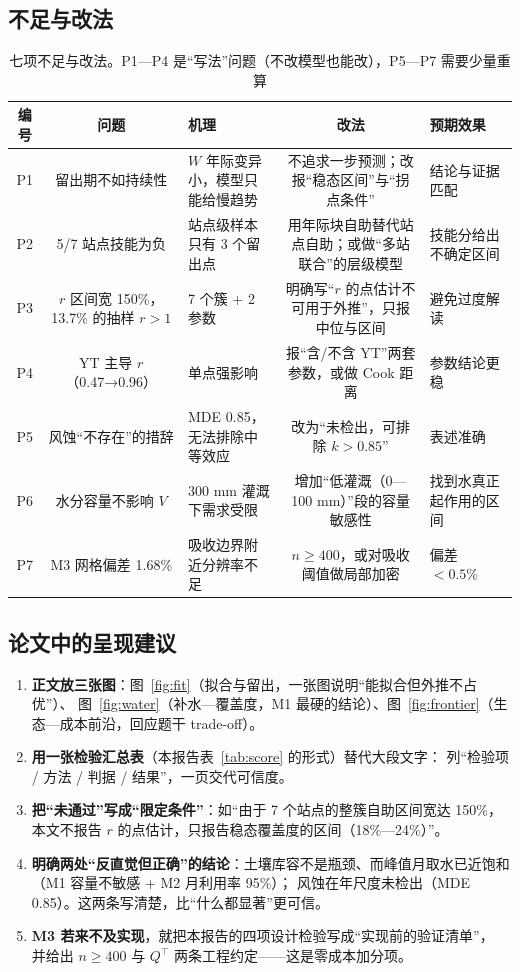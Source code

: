 \documentclass[11pt,a4paper]{ctexart}
\begin{document}
\subsection{不足与改法}

\begin{table}[htbp]\centering\footnotesize
\begin{tabularx}{\textwidth}{|c|c|X|c|X|}
\toprule
编号 & 问题 & 机理 & 改法 & 预期效果 \\
\midrule
P1 & 留出期不如持续性 & $W$ 年际变异小，模型只能给慢趋势 & 不追求一步预测；改报“稳态区间”与“拐点条件”
& 结论与证据匹配 \\
P2 & 5/7 站点技能为负 & 站点级样本只有 3 个留出点 & 用年际块自助替代站点自助；或做“多站联合”的层级模型
& 技能分给出不确定区间 \\
P3 & $r$ 区间宽 150\%，13.7\% 的抽样 $r>1$ & 7 个簇 + 2 参数 & 明确写“$r$ 的点估计不可用于外推”，只报中位与区间
& 避免过度解读 \\
P4 & YT 主导 $r$（0.47→0.96） & 单点强影响 & 报“含/不含 YT”两套参数，或做 Cook 距离
& 参数结论更稳 \\
P5 & 风蚀“不存在”的措辞 & MDE 0.85，无法排除中等效应 & 改为“未检出，可排除 $k>0.85$”
& 表述准确 \\
P6 & 水分容量不影响 $V$ & 300 mm 灌溉下需求受限 & 增加“低灌溉（0—100 mm）”段的容量敏感性
& 找到水真正起作用的区间 \\
P7 & M3 网格偏差 1.68\% & 吸收边界附近分辨率不足 & $n\ge400$，或对吸收阈值做局部加密
& 偏差 $<0.5\%$ \\
\bottomrule
\end{tabularx}
\caption{七项不足与改法。P1—P4 是“写法”问题（不改模型也能改），P5—P7 需要少量重算}\label{tab:fix}
\end{table}

\subsection{论文中的呈现建议}

\begin{enumerate}
\item \textbf{正文放三张图}：图~\ref{fig:fit}（拟合与留出，一张图说明“能拟合但外推不占优”）、
      图~\ref{fig:water}（补水—覆盖度，M1 最硬的结论）、图~\ref{fig:frontier}（生态—成本前沿，回应题干 trade-off）。
\item \textbf{用一张检验汇总表}（本报告表~\ref{tab:score} 的形式）替代大段文字：
      列“检验项 / 方法 / 判据 / 结果”，一页交代可信度。
\item \textbf{把“未通过”写成“限定条件”}：如“由于 7 个站点的整簇自助区间宽达 150\%，
      本文不报告 $r$ 的点估计，只报告稳态覆盖度的区间（18\%—24\%）”。
\item \textbf{明确两处“反直觉但正确”的结论}：土壤库容不是瓶颈、而峰值月取水已近饱和（M1 容量不敏感 + M2 月利用率 95\%）；
      风蚀在年尺度未检出（MDE 0.85）。这两条写清楚，比“什么都显著”更可信。
\item \textbf{M3 若来不及实现}，就把本报告的四项设计检验写成“实现前的验证清单”，
      并给出 $n\ge400$ 与 $Q^{\top}$ 两条工程约定——这是零成本加分项。
\end{enumerate}
\end{document}

